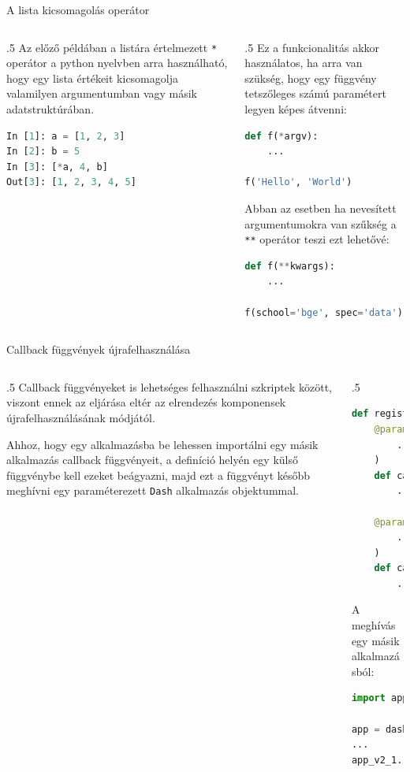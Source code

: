 \documentclass[english, aspectratio=169]{beamer}
\begin{document}
\begin{frame}[fragile]{A lista kicsomagolás operátor}
	\begin{columns}
		\begin{column}{.5\textwidth}
			Az előző példában a listára értelmezett \texttt{*} operátor a python nyelvben arra használható, hogy egy lista értékeit kicsomagolja valamilyen argumentumban vagy másik adatstruktúrában.
			\begin{lstlisting}[language=python]
In [1]: a = [1, 2, 3]
In [2]: b = 5
In [3]: [*a, 4, b]
Out[3]: [1, 2, 3, 4, 5]
			\end{lstlisting}
		\end{column}
		\begin{column}{.5\textwidth}
			Ez a funkcionalitás akkor használatos, ha arra van szükség, hogy egy függvény tetszőleges számú paramétert legyen képes átvenni:
			\begin{lstlisting}[language=python]
def f(*argv):
	...
	
f('Hello', 'World')
			\end{lstlisting}
			Abban az esetben ha nevesített argumentumokra van szűkség a \texttt{**} operátor teszi ezt lehetővé:
			\begin{lstlisting}[language=python]
def f(**kwargs):
	...

f(school='bge', spec='data')
			\end{lstlisting}
		\end{column}
	\end{columns}
\end{frame}

\begin{frame}[fragile]{Callback függvények újrafelhasználása}
	\begin{columns}
		\begin{column}{.5\textwidth}
			Callback függvényeket is lehetséges felhasználni szkriptek között, viszont ennek az eljárása eltér az elrendezés komponensek újrafelhasználásának módjától.\par\smallskip
			Ahhoz, hogy egy alkalmazásba be lehessen importálni egy másik alkalmazás callback függvényeit, a definíció helyén egy külső függvénybe kell ezeket beágyazni, majd ezt a függvényt később meghívni egy paraméterezett \texttt{Dash} alkalmazás objektummal.
		\end{column}
		\begin{column}{.5\textwidth}
			\begin{lstlisting}[language=python]
def register_callbacks(param_app):
	@param_app.callback(
		...
	)
	def callback1(...):
		...
	
	@param_app.callback(
		...
	)
	def callback2(...):
		...				
			\end{lstlisting}
			A meghívás egy másik alkalmazásból:
			\begin{lstlisting}[language=python]
import app_v2_1

app = dash.Dash(__name___)
...
app_v2_1.register_callbacks(app)
			\end{lstlisting}
		\end{column}
	\end{columns}
\end{frame}
\end{document}
